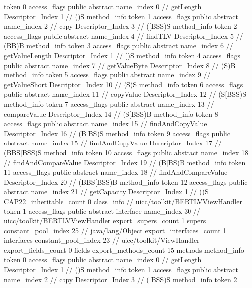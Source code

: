 {{{{{					token	0
					access_flags	public abstract
					name_index	0		// getLength
					Descriptor_Index	1		// ()S
				}
				method_info {
					token	1
					access_flags	public abstract
					name_index	2		// copy
					Descriptor_Index	3		// ([BSS)S
				}
				method_info {
					token	2
					access_flags	public abstract
					name_index	4		// findTLV
					Descriptor_Index	5		// (BB)B
				}
				method_info {
					token	3
					access_flags	public abstract
					name_index	6		// getValueLength
					Descriptor_Index	1		// ()S
				}
				method_info {
					token	4
					access_flags	public abstract
					name_index	7		// getValueByte
					Descriptor_Index	8		// (S)B
				}
				method_info {
					token	5
					access_flags	public abstract
					name_index	9		// getValueShort
					Descriptor_Index	10		// (S)S
				}
				method_info {
					token	6
					access_flags	public abstract
					name_index	11		// copyValue
					Descriptor_Index	12		// (S[BSS)S
				}
				method_info {
					token	7
					access_flags	public abstract
					name_index	13		// compareValue
					Descriptor_Index	14		// (S[BSS)B
				}
				method_info {
					token	8
					access_flags	public abstract
					name_index	15		// findAndCopyValue
					Descriptor_Index	16		// (B[BS)S
				}
				method_info {
					token	9
					access_flags	public abstract
					name_index	15		// findAndCopyValue
					Descriptor_Index	17		// (BBS[BSS)S
				}
				method_info {
					token	10
					access_flags	public abstract
					name_index	18		// findAndCompareValue
					Descriptor_Index	19		// (B[BS)B
				}
				method_info {
					token	11
					access_flags	public abstract
					name_index	18		// findAndCompareValue
					Descriptor_Index	20		// (BBS[BSS)B
				}
				method_info {
					token	12
					access_flags	public abstract
					name_index	21		// getCapacity
					Descriptor_Index	1		// ()S
				}
			}
			CAP22_inheritable_count	0
		}
		class_info {		// uicc/toolkit/BERTLVViewHandler
			token	1
			access_flags	public abstract interface
			name_index	30		// uicc/toolkit/BERTLVViewHandler
			export_supers_count	1
			supers {
				constant_pool_index	25		// java/lang/Object
			}
			export_interfaces_count	1
			interfaces {
				constant_pool_index	23		// uicc/toolkit/ViewHandler
			}
			export_fields_count	0
			fields {
			}
			export_methods_count	15
			methods {
				method_info {
					token	0
					access_flags	public abstract
					name_index	0		// getLength
					Descriptor_Index	1		// ()S
				}
				method_info {
					token	1
					access_flags	public abstract
					name_index	2		// copy
					Descriptor_Index	3		// ([BSS)S
				}
				method_info {
					token	2
}}}}}
